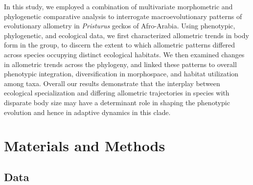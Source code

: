 \documentclass[
  11pt,
]{article}
\begin{document}
In this study, we employed a combination of multivariate morphometric
and phylogenetic comparative analysis to interrogate macroevolutionary
patterns of evolutionary allometry in \emph{Pristurus} geckos of
Afro-Arabia. Using phenotypic, phylogenetic, and ecological data, we
first characterized allometric trends in body form in the group, to
discern the extent to which allometric patterns differed across species
occupying distinct ecological habitats. We then examined changes in
allometric trends across the phylogeny, and linked these patterns to
overall phenotypic integration, diversification in morphospace, and
habitat utilization among taxa. Overall our results demonstrate that the
interplay between ecological specialization and differing allometric
trajectories in species with disparate body size may have a determinant
role in shaping the phenotypic evolution and hence in adaptive dynamics
in this clade.

\hypertarget{materials-and-methods}{%
\section{Materials and Methods}\label{materials-and-methods}}

\hypertarget{data}{%
\subsection{Data}\label{data}}
\end{document}
